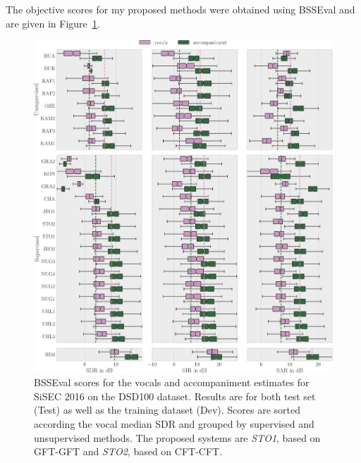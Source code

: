 The objective scores for my proposed methods were obtained using BSSEval and are given in Figure~\ref{fig:eval}.

\begin{figure}[htbp]
	\includegraphics[width=1.1\textwidth]{Chapters/06_Separation_Unknown/figures/evaluation.pdf}
	\caption{BSSEval scores for the vocals and accompaniment estimates for SiSEC 2016 on the DSD100 dataset. Results are for both test set (Test) as well as the training dataset (Dev). Scores are sorted according the vocal median SDR and grouped by supervised and unsupervised methods. The proposed systems are \emph{STO1}, based on GFT-GFT and \emph{STO2}, based on CFT-CFT.}
	\label{fig:eval}
\end{figure}

